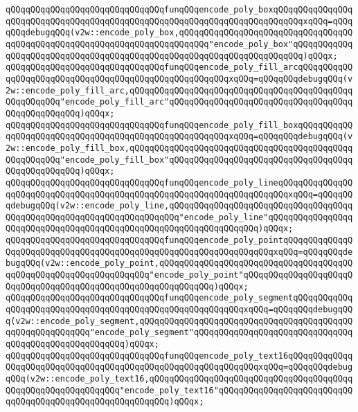 \verb|qQQqqQQqqQQqqQQqqQQqqQQqqQQqqQQqfunqQQqencode_poly_boxqQQqqQQqqQQqqQQqqQQqqQQqqQQqqQQqqQQqqQQqqQQqqQQqqQQqqQQqqQQqqQQqqQQqqQQqqQQqxqQQq=qQQqqQQqdebugqQQq(v2w::encode_poly_box,qQQqqQQqqQQqqQQqqQQqqQQqqQQqqQQqqQQqqQQqqQQqqQQqqQQqqQQqqQQqqQQqqQQqqQQqqQQq"encode_poly_box"qQQqqQQqqQQqqQQqqQQqqQQqqQQqqQQqqQQqqQQqqQQqqQQqqQQqqQQqqQQqqQQqqQQqqQQq)qQQqx;|\newline
\verb|qQQqqQQqqQQqqQQqqQQqqQQqqQQqqQQqfunqQQqencode_poly_fill_arcqQQqqQQqqQQqqQQqqQQqqQQqqQQqqQQqqQQqqQQqqQQqqQQqqQQqqQQqxqQQq=qQQqqQQqdebugqQQq(v2w::encode_poly_fill_arc,qQQqqQQqqQQqqQQqqQQqqQQqqQQqqQQqqQQqqQQqqQQqqQQqqQQqqQQq"encode_poly_fill_arc"qQQqqQQqqQQqqQQqqQQqqQQqqQQqqQQqqQQqqQQqqQQqqQQqqQQq)qQQqx;|\newline
\verb|qQQqqQQqqQQqqQQqqQQqqQQqqQQqqQQqfunqQQqencode_poly_fill_boxqQQqqQQqqQQqqQQqqQQqqQQqqQQqqQQqqQQqqQQqqQQqqQQqqQQqqQQqxqQQq=qQQqqQQqdebugqQQq(v2w::encode_poly_fill_box,qQQqqQQqqQQqqQQqqQQqqQQqqQQqqQQqqQQqqQQqqQQqqQQqqQQqqQQq"encode_poly_fill_box"qQQqqQQqqQQqqQQqqQQqqQQqqQQqqQQqqQQqqQQqqQQqqQQqqQQq)qQQqx;|\newline
\verb|qQQqqQQqqQQqqQQqqQQqqQQqqQQqqQQqfunqQQqencode_poly_lineqQQqqQQqqQQqqQQqqQQqqQQqqQQqqQQqqQQqqQQqqQQqqQQqqQQqqQQqqQQqqQQqqQQqqQQqxqQQq=qQQqqQQqdebugqQQq(v2w::encode_poly_line,qQQqqQQqqQQqqQQqqQQqqQQqqQQqqQQqqQQqqQQqqQQqqQQqqQQqqQQqqQQqqQQqqQQqqQQq"encode_poly_line"qQQqqQQqqQQqqQQqqQQqqQQqqQQqqQQqqQQqqQQqqQQqqQQqqQQqqQQqqQQqqQQqqQQq)qQQqx;|\newline
\verb|qQQqqQQqqQQqqQQqqQQqqQQqqQQqqQQqfunqQQqencode_poly_pointqQQqqQQqqQQqqQQqqQQqqQQqqQQqqQQqqQQqqQQqqQQqqQQqqQQqqQQqqQQqqQQqqQQqxqQQq=qQQqqQQqdebugqQQq(v2w::encode_poly_point,qQQqqQQqqQQqqQQqqQQqqQQqqQQqqQQqqQQqqQQqqQQqqQQqqQQqqQQqqQQqqQQqqQQq"encode_poly_point"qQQqqQQqqQQqqQQqqQQqqQQqqQQqqQQqqQQqqQQqqQQqqQQqqQQqqQQqqQQqqQQq)qQQqx;|\newline
\verb|qQQqqQQqqQQqqQQqqQQqqQQqqQQqqQQqfunqQQqencode_poly_segmentqQQqqQQqqQQqqQQqqQQqqQQqqQQqqQQqqQQqqQQqqQQqqQQqqQQqqQQqqQQqxqQQq=qQQqqQQqdebugqQQq(v2w::encode_poly_segment,qQQqqQQqqQQqqQQqqQQqqQQqqQQqqQQqqQQqqQQqqQQqqQQqqQQqqQQqqQQq"encode_poly_segment"qQQqqQQqqQQqqQQqqQQqqQQqqQQqqQQqqQQqqQQqqQQqqQQqqQQqqQQq)qQQqx;|\newline
\verb|qQQqqQQqqQQqqQQqqQQqqQQqqQQqqQQqfunqQQqencode_poly_text16qQQqqQQqqQQqqQQqqQQqqQQqqQQqqQQqqQQqqQQqqQQqqQQqqQQqqQQqqQQqqQQqxqQQq=qQQqqQQqdebugqQQq(v2w::encode_poly_text16,qQQqqQQqqQQqqQQqqQQqqQQqqQQqqQQqqQQqqQQqqQQqqQQqqQQqqQQqqQQqqQQq"encode_poly_text16"qQQqqQQqqQQqqQQqqQQqqQQqqQQqqQQqqQQqqQQqqQQqqQQqqQQqqQQqqQQq)qQQqx;|\newline
